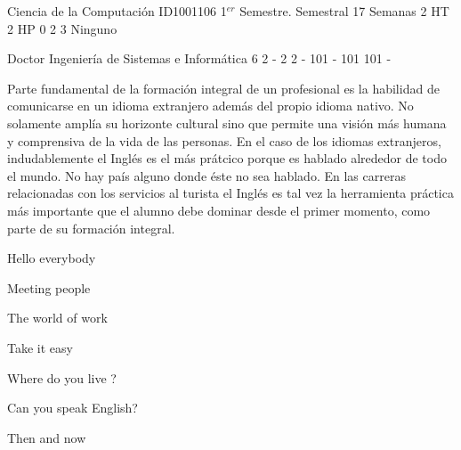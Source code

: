 \documentclass[a4paper,8pt]{article}
\begin{document}
\setNombreProfesor{}
\setGradoProfesorAbreviado{}
\sylabusHeader

\academicaTable
{Ciencia de la Computación} %
{ID1001106} %
{1$^{er}$ Semestre.} %
{Semestral} %
{17 Semanas} %
{2 HT} %
{2 HP} %
{0} %
{}  %
{2} %
{3} %
{Ninguno} %

\administrativaTable
{Doctor} %
{Ingeniería de Sistemas e Informática} %
{6} %
{2} %
{-} %
{2} %
{2} %
{-} %
{101} %
{-} %
{101} %
{101} %
{-} %


\begin{fundamentacion}
Parte fundamental de la formación integral de un profesional es la habilidad de comunicarse en un idioma extranjero además del propio idioma nativo. No solamente amplía su horizonte cultural sino que permite una visión más humana y comprensiva de la vida de las personas. En el caso de los idiomas extranjeros, indudablemente el Inglés es el más prátcico porque es hablado alrededor de todo el mundo. No hay país alguno donde éste no sea hablado. En las carreras relacionadas con los servicios al turista el Inglés es tal vez la herramienta práctica más importante que el alumno debe dominar desde el primer momento, como parte de su formación integral.

\end{fundamentacion}

\begin{sumilla}
\item Hello everybody
\item Meeting people
\item The world of work
\item Take it easy
\item Where do you live ?
\item Can you speak English?
\item Then and now

\end{sumilla}
\end{document}
